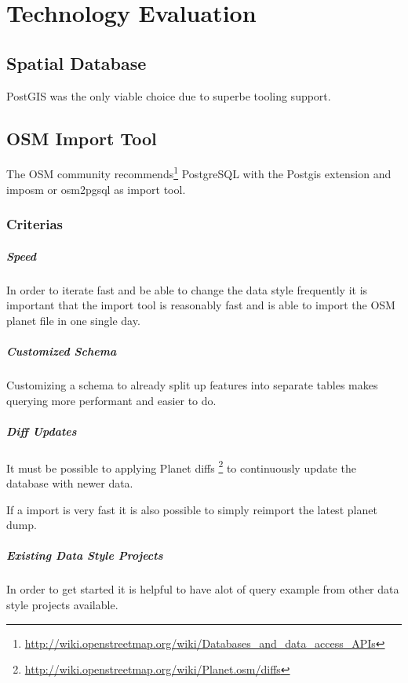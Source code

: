 \chapter{Technology Evaluation}

\section{Spatial Database}

PostGIS was the only viable choice due to superbe tooling support.

\section{OSM Import Tool}\label{osm-import-tool}
The OSM community
recommends\footnote{\url{http://wiki.openstreetmap.org/wiki/Databases_and_data_access_APIs}}
PostgreSQL with the Postgis extension and imposm or osm2pgsql as import tool.

\subsection{Criterias}

\paragraph{Speed} 
In order to iterate fast and be able to change the data style frequently
it is important that the import tool is reasonably fast and is able
to import the OSM planet file in one single day.

\paragraph{Customized Schema}
Customizing a schema to already split up features into separate tables
makes querying more performant and easier to do.

\paragraph{Diff Updates}
It must be possible to applying Planet diffs \footnote{\url{http://wiki.openstreetmap.org/wiki/Planet.osm/diffs}} 
to continuously update the database with newer data.

If a import is very fast it is also possible to simply reimport the latest
planet dump.

\paragraph{Existing Data Style Projects}
In order to get started it is helpful to have alot of query example
from other data style projects available.

